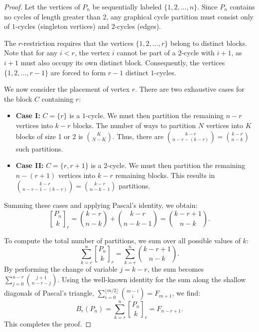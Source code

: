 \documentclass{amsart}
\newcounter{cases}
\theoremstyle{definition}
\begin{document}
\begin{proof}
Let the vertices of $P_n$ be sequentially labeled $\{1, 2, \dots, n\}$. Since $P_n$ contains no cycles of length greater than 2, any graphical cycle partition must consist only of $1$-cycles (singleton vertices) and $2$-cycles (edges). 

The $r$-restriction requires that the vertices $\{1, 2, \dots, r\}$ belong to distinct blocks. Note that for any $i < r$, the vertex $i$ cannot be part of a $2$-cycle with $i+1$, as $i+1$ must also occupy its own distinct block. Consequently, the vertices $\{1, 2, \dots, r-1\}$ are forced to form $r-1$ distinct $1$-cycles. 

We now consider the placement of vertex $r$. There are two exhaustive cases for the block $C$ containing $r$:
\begin{itemize}
    \item \textbf{Case I:} $C = \{r\}$ is a $1$-cycle. We must then partition the remaining $n-r$ vertices into $k-r$ blocks. The number of ways to partition $N$ vertices into $K$ blocks of size 1 or 2 is $\binom{K}{N-K}$. Thus, there are $\binom{k-r}{n-r-(k-r)} = \binom{k-r}{n-k}$ such partitions.
    \item \textbf{Case II:} $C = \{r, r+1\}$ is a $2$-cycle. We must then partition the remaining $n-(r+1)$ vertices into $k-r$ remaining blocks. This results in $\binom{k-r}{n-r-1-(k-r)} = \binom{k-r}{n-k-1}$ partitions.
\end{itemize}



Summing these cases and applying Pascal's identity, we obtain:
\begin{equation*}
    {P_n \brack k}_r = \binom{k-r}{n-k} + \binom{k-r}{n-k-1} = \binom{k-r+1}{n-k}.
\end{equation*}

To compute the total number of partitions, we sum over all possible values of $k$:
\begin{equation*}
    \sum_{k=r}^{n} {P_n \brack k}_r = \sum_{k=r}^{n} \binom{k-r+1}{n-k}.
\end{equation*}
By performing the change of variable $j = k-r$, the sum becomes $\sum_{j=0}^{n-r} \binom{j+1}{n-r-j}$. Using the well-known identity for the sum along the shallow diagonals of Pascal's triangle, $\sum_{i=0}^{\lfloor m/2 \rfloor} \binom{m-i}{i} = F_{m+1}$, we find:
\begin{equation*}
   B_r(P_n)=\sum_{k=r}^{n} {P_n \brack k}_r = F_{n-r+1}.
\end{equation*}
This completes the proof.
\end{proof}
\end{document}
